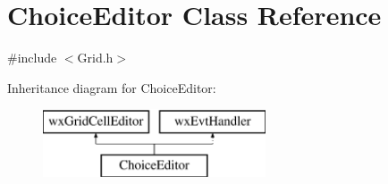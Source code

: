 \hypertarget{class_choice_editor}{}\section{Choice\+Editor Class Reference}
\label{class_choice_editor}


{\ttfamily \#include $<$Grid.\+h$>$}

Inheritance diagram for Choice\+Editor\+:\begin{figure}[H]
\begin{center}
\leavevmode
\includegraphics[height=2.000000cm]{class_choice_editor}
\end{center}
\end{figure}
